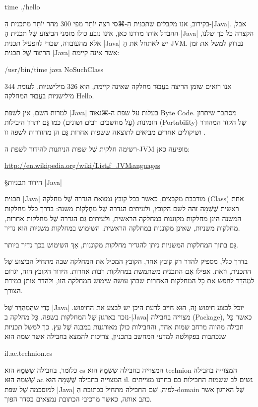 time ./hello
\END

בקירוב, אנו מקבלים שתכנית הַ-⌘סי רצה יוֹתֵר מפי 300 מהר יוֹתֵר מתכנית הַ-|Java|.
אבל, ההבדל אותו מדדנו כאן, אינו נובע כולו מזמני הביצוע שֶׁל תכנית הַ-|Java|
הקצרה כל כך שלנו, אלא מהעובדה, שכדי להפעיל תכנית \E|Java| יש לאתחל את
הַ-JVM. נבדוק למשל את זמן הריצה שֶׁל תכנית \E|Java| אשר אינה קיימת:

/usr/bin/time java NoSuchClass
\END

אנו רואים שזמן הריצה בעֲבוּר מחלקה שאינה קיימת, הוא 326 מילישניות, לעומת 344
מילישניות בעֲבוּר המחלקה Hello.

למרות השם, אֵין לשפת \E|Java| בעלות עַל שפת הַ-⌘גאוה Byte Code. מסתבר שיתרון הזמינות
(עַל מחשבים רבים ושונים) כמו גַּם יתרון היבילות (Portability) שֶׁל הקוד המהודר
ושיקולים אחרים מביאים לתוצאה ששפות אחרות גַּם הן מהודרות לשפה זוֹ .

רשימה חלקית שֶׁל שפות הניתנות להידור לשפת ה-JVM מופיעה כאן:

\begin{english}
\url{http://en.wikipedia.org/wiki/Listₒf_JVMₗanguages}
\end{english}

§הידור תכניות \E|Java|

תכנית \E|Java| מורכבת מקבצים, כאשר בכל קובץ נמצאת הגדרה שֶׁל מחלקה
(Class)
 אחת ראשית שֶׁשְּׁמָהּ זהה לשם הקובץ,
ולעיתים הגדרה שֶׁל מַחְלְקוֹת
משנה: בדרך כלל מחלקות המשנה הינן מחלקות מקוננות במחלקה הראשית, ולעיתים גַּם
הגדרה שֶׁל מחלקות אחרות, מחלקות משניות, שאינן מקוננות במחלקה הראשית. השימוש
במחלקות משניות הוּא נדיר.

גַּם בתוך המחלקות המשניות ניתן להגדיר מחלקות מקוננות, אַךְ השימוש בכך
נדיר ביותר.

בדרך כלל, מספיק להדר רק קובץ אחד, הקובץ המכיל את המחלקה שבה מתחיל
הביצוע שֶׁל התכנית, וזאת, אפילו אִם התכנית משתמשת במחלקות רבות אחרות.
הידור הקובץ הזה, יגרום למְהַדֵּר לחפש את כָּל המחלקות האחרות שבהן
עושה שימוש המחלקה הזו, ולהדר אותן במידת הצורך.

כְּדֵי שהַמְּהַדֵּר שֶׁל \E|Java| יוכל לבצע חיפוש זֶה, הוּא חייב לדעת היכן יש לבצע
את החיפוש. נזכר בארגון שֶׁל המחלקות בשפה. כָּל מחלקה ב-|Java| מצוייה
בחבילה (Package), כאשר כָּל חבילה מהווה מרחב שמות אחד, והחבילות כולן מאורגנות
במבנה שֶׁל עץ. כך למשל תכניות שנכתבות בפקולטה למדעי המחשב בתכניון,
צריכות להמצא בחבילה אשר שמה הוּא

il.ac.technion.cs

כלומר, בחבילה שֶׁשְּׁמָהּ הוּא cs המצוייה בחבילה שֶׁשְּׁמָהּ הוּא technion
המצוייה בחבילה שֶׁשְּׁמָהּ הוּא ac המצוייה בחבילה שֶׁשְּׁמָהּ הוּא il. נשים לב
ששמות החבילות בם בחרנו מצייתים למוסכמה שֶׁל שפת \E|Java| לפיה, שֵׁם החבילה מתחיל
בכתובת הַ-domain שֶׁל הארגון אשר כתב אותה, כאשר מרכיבי הכתובת נמצאים בסדר
הפוך.

